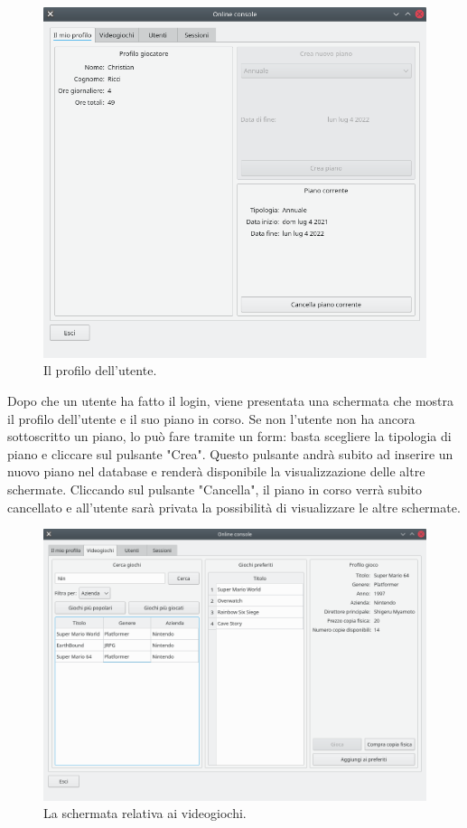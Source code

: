 \documentclass[a4paper,12pt]{report}
\begin{document}
\begin{figure}[H]
\centering{}
\includegraphics[width=12cm]{screen_profile.png}
\caption{Il profilo dell'utente.}
\label{img:screen_login}
\end{figure}

Dopo che un utente ha fatto il login, viene presentata una schermata che mostra il profilo dell'utente e il suo piano in corso. Se non l'utente non ha ancora sottoscritto un piano, lo può fare tramite un form: basta scegliere la tipologia di piano e cliccare sul pulsante "Crea". Questo pulsante andrà subito ad inserire un nuovo piano nel database e renderà disponibile la visualizzazione delle altre schermate. Cliccando sul pulsante "Cancella", il piano in corso verrà subito cancellato e all'utente sarà privata la possibilità di visualizzare le altre schermate.

\begin{figure}[H]
\centering{}
\includegraphics[width=12cm]{screen_games.png}
\caption{La schermata relativa ai videogiochi.}
\label{img:screen_login}
\end{figure}
\end{document}
